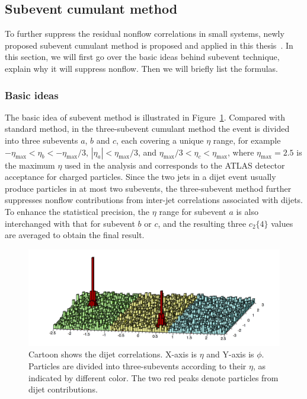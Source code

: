 \subsection{Subevent cumulant method}
\label{sec:subevent_cumulant_method}

To further suppress the residual nonflow correlations in small systems, newly proposed subevent cumulant method is proposed and applied in this thesis~\cite{Jia:2017hbm}. In this section, we will first go over the basic ideas behind subevent technique, explain why it will suppress nonflow. Then we will briefly list the formulas.



\subsubsection{Basic ideas}

The basic idea of subevent method is illustrated in Figure~\ref{fig:subcumu_dijet_cartoon}. Compared with standard method, in the three-subevent cumulant method the event is divided into three subevents $a$, $b$ and $c$, each covering a unique $\eta$ range, for example $-\eta_\text{max}<\eta_b<-\eta_\text{max}/3$, $|\eta_a|<\eta_\text{max}/3$, and $\eta_\text{max}/3<\eta_c<\eta_\text{max}$, where $\eta_\text{max}=2.5$ is the maximum $\eta$ used in the analysis and corresponds to the ATLAS detector acceptance for charged particles. Since the two jets in a dijet event usually produce particles in at most two subevents, the three-subevent method further suppresses nonflow contributions from inter-jet correlations associated with dijets. To enhance the statistical precision, the $\eta$ range for subevent $a$ is also interchanged with that for subevent $b$ or $c$, and the resulting three $c_2\{4\}$ values are averaged to obtain the final result.
\begin{figure}[H]
\centering
\includegraphics[width=.95\linewidth]{figs/chapter_subcumu/dijet_cartoon2.png}
\caption{Cartoon shows the dijet correlations. X-axis is $\eta$ and Y-axis is $\phi$. Particles are divided into three-subevents according to their $\eta$, as indicated by different color. The two red peaks denote particles from dijet contributions.}
\label{fig:subcumu_dijet_cartoon}
\end{figure}

